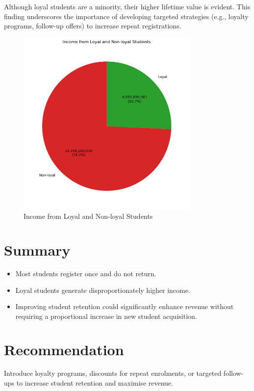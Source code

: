 \documentclass[12pt,a4paper]{article}
\begin{document}
Although loyal students are a minority, their higher lifetime value is evident. This finding underscores the importance of developing targeted strategies (e.g., loyalty programs, follow-up offers) to increase repeat registrations.

\begin{figure}[h!]
    \centering
    \includegraphics[width=0.8\textwidth]{Income from Loyal and Non-loyal Students (Pie Chart).png}
    \caption{Income from Loyal and Non-loyal Students}
    \label{fig:loyalty-income}
\end{figure}

\section*{Summary}
\begin{itemize}
    \item Most students register once and do not return.
    \item Loyal students generate disproportionately higher income.
    \item Improving student retention could significantly enhance revenue without requiring a proportional increase in new student acquisition.
\end{itemize}

\section*{Recommendation}
Introduce loyalty programs, discounts for repeat enrolments, or targeted follow-ups to increase student retention and maximise revenue.
\end{document}
